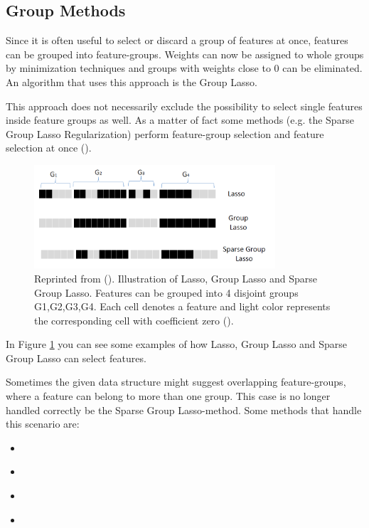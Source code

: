 \subsection{Group Methods}
\label{sec:methods.structured.group}

  
Since it is often useful to select or discard a group of features at once,
features can be grouped into feature-groups. Weights can now be assigned to
whole groups by minimization techniques and groups with weights close to $0$ can be
eliminated. An algorithm that uses this approach is the Group Lasso. 

This approach does not necessarily exclude the possibility to select single
features inside feature groups as well. As a matter of fact some methods
(e.g. the Sparse Group Lasso Regularization) perform feature-group selection and
feature selection at once (\cite{Tang:04}).

\begin{figure}[!ht]
  \centering 
  \includegraphics[width=0.8\textwidth]{chapters/methods/structured/group_lasso}
  \caption{Reprinted from (\cite{Tang:04}). Illustration of Lasso, Group Lasso
  and Sparse Group Lasso.
  Features can be grouped into 4 disjoint groups {G1,G2,G3,G4}. Each cell denotes a feature and light color
represents the corresponding cell with coefficient zero (\cite{Tang:04}).}
  \label{fig:methods.structured.group.lasso}
\end{figure}

In Figure \ref{fig:methods.structured.group.lasso} you can see some examples of
how Lasso, Group Lasso and Sparse Group Lasso can select features. 

Sometimes the given data structure might suggest overlapping feature-groups,
where a feature can belong to more than one group. This case is no longer
handled correctly be the Sparse Group Lasso-method. Some methods that handle
this scenario are:

\begin{itemize}
  \item \cite{Liu:10}
  \item \cite{Kim:10}
  \item \cite{Jenatton:10}
  \item \cite{Jacob:09}
\end{itemize}






